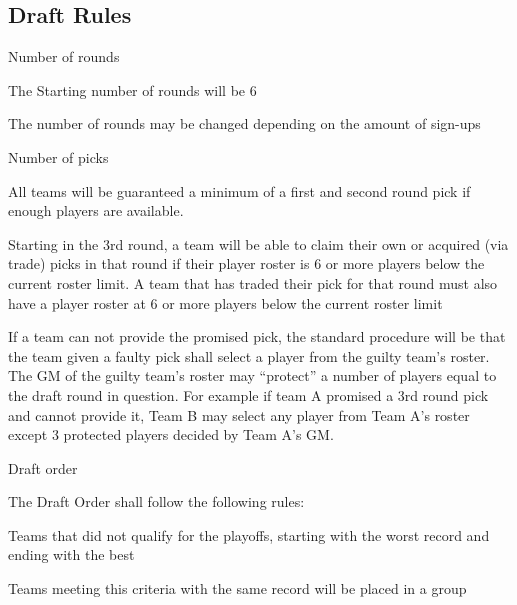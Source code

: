 
\subsection{Draft Rules}
\begin{deepEnumerate}
	\item Number of rounds
	\begin{deepEnumerate}
		\item The Starting number of rounds will be 6
		\item The number of rounds may be changed depending on the amount of sign-ups
	\end{deepEnumerate}
	\item Number of picks
	\begin{deepEnumerate}
		\item All teams will be guaranteed a minimum of a first and second round pick if
		 enough players are available. 
		\item Starting in the 3rd round, a team will be able to claim their own or acquired
		 (via trade) picks in that round if their player roster is 6 or more players below the
		 current roster limit. A team that has traded their pick for that round must also have
		 a player roster at 6 or more players below the current roster limit
		\item  If a team can not provide the promised pick, the standard procedure will be that
		 the team given a faulty pick shall select a player from the guilty team’s roster. The GM of the guilty
 		team’s roster may “protect” a number of players equal to the draft round in question. For example if
 		team A promised a 3rd round pick and cannot provide it, Team B may select any player from Team A’s
 		roster except 3 protected players decided by Team A’s GM.
	\end{deepEnumerate}
	\item Draft order
	\begin{deepEnumerate}
		\item The Draft Order shall follow the following rules:
		\begin{deepEnumerate}
			\item Teams that did not qualify for the playoffs, starting with the worst record and ending with the best
			\begin{deepEnumerate}
				\item Teams meeting this criteria with the same record will be placed in a group
			\end{deepEnumerate}

\end{deepEnumerate}
\end{deepEnumerate}
\end{deepEnumerate}

